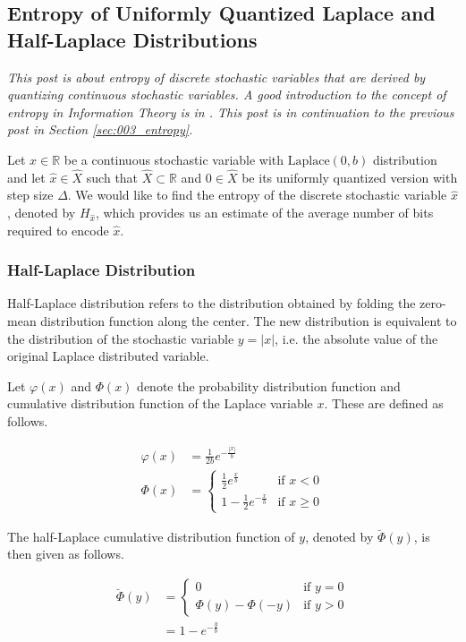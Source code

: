 \subsection{Entropy of Uniformly Quantized Laplace and Half-Laplace Distributions}
\label{sec:004_entropy}

\emph{This post is about entropy of discrete stochastic variables that are derived by quantizing continuous stochastic variables. A good introduction to the concept of entropy in Information Theory is in \cite{Cover2012}. This post is in continuation to the previous post in Section \ref{sec:003_entropy}.}

Let $x \in \mathbb{R}$ be a continuous stochastic variable with $\text{Laplace}(0, b)$ distribution and let $\hat{x} \in \hat{X}$ such that $\hat{X} \subset \mathbb{R}$ and $0 \in \hat{X}$ be its uniformly quantized version with step size $\Delta$. We would like to find the entropy of the discrete stochastic variable $\hat{x}$, denoted by $H_{\hat{x}}$, which provides us an estimate of the average number of bits required to encode $\hat{x}$.

\subsubsection{Half-Laplace Distribution}

Half-Laplace distribution refers to the distribution obtained by folding the zero-mean distribution function along the center. The new distribution is equivalent to the distribution of the stochastic variable $y = |x|$, i.e. the absolute value of the original Laplace distributed variable.

Let $\varphi(x)$ and $\Phi(x)$ denote the probability distribution function and cumulative distribution function of the Laplace variable $x$. These are defined as follows.

\begin{align}\varphi(x) &= \frac{1}{2b} e^{-\frac{|x|}{b}} \\ \Phi(x) &= \begin{cases} \frac{1}{2} e^{\frac{x}{b}} & \text{if $x < 0$} \\ 1 - \frac{1}{2} e^{-\frac{x}{b}} & \text{if $x \geq 0$}\end{cases}\end{align}

The half-Laplace cumulative distribution function of $y$, denoted by $\breve{\Phi}(y)$, is then given as follows.

\begin{align} \breve{\Phi}(y) &= \begin{cases} 0 & \text{if $y = 0$} \\ \Phi(y) - \Phi(-y) & \text{if $y > 0$}\end{cases} \\ &= 1 - e^{-\frac{y}{b}} \label{eqn:le} \end{align}

